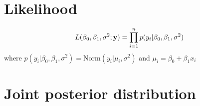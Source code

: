 \documentclass[12pt]{article}
\begin{document}
\section{Likelihood}

\[
  L(\beta_0,\beta_1,\sigma^2; {\bf y}) = \prod_{i=1}^n p(y_i|\beta_0,\beta_1,\sigma^2)
\]
where $p(y_i|\beta_0,\beta_1,\sigma^2) = \mathrm{Norm}(y_i|\mu_i,\sigma^2)$ and $\mu_i = \beta_0 + \beta_1x_i$


\section{Joint posterior distribution}
\end{document}
